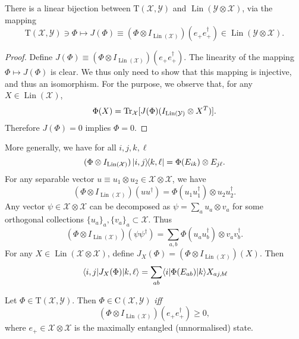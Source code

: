 \documentclass[12pt]{report}
\newcommand{\calY}{{\mathcal{Y}}}
\newcommand{\calX}{{\mathcal{X}}}
\newcommand{\rmC}{{\mathrm{C}}}
\newcommand{\rmT}{{\mathrm{T}}}
\DeclareMathOperator{\Lin}{Lin}
\begin{document}
\begin{prop}
	There is a linear bijection between $\rmT(\calX,\calY)$ and $\Lin(\calY\otimes\calX)$, via the mapping
	\begin{equation}
		\rmT(\calX,\calY)\ni \Phi\mapsto
		J(\Phi) \equiv (\Phi\otimes I_{\Lin(\calX)})(e_+ e_+^\dagger)\in\Lin(\calY\otimes\calX).
	\end{equation}
\end{prop}
\begin{proof}
	Define $J(\Phi) \equiv (\Phi\otimes I_{\Lin(\calX)})(e_+ e_+^\dagger)$.
	The linearity of the mapping $\Phi\mapsto J(\Phi)$ is clear.
	We thus only need to show that this mapping is injective, and thus an isomorphism.
	For the purpose, we observe that, for any $X\in\Lin(\calX)$,
	\begin{equation}
		\Phi(X) = \Tr_\calX [J(\Phi)(I_{\Lin(\calY)}\otimes X^T)].
	\end{equation}
	Therefore $J(\Phi)=0$ implies $\Phi=0$.
\end{proof}

More generally, we have for all $i,j,k,\ell$
\begin{equation}
	(\Phi\otimes I_{\Lin(\calX)})\ketbra{i,j}{k,\ell}
	= \Phi(E_{ik}) \otimes E_{j\ell}.
\end{equation}
For any separable vector $u\equiv u_1\otimes u_2\in\calX\otimes\calX$, we have
\begin{equation}
	(\Phi\otimes I_{\Lin(\calX)}) (uu^\dagger)
	= \Phi(u_1 u_1^\dagger) \otimes u_2 u_2^\dagger.
\end{equation}
Any vector $\psi\in\calX\otimes\calX$ can be decomposed as
$\psi=\sum_a u_a\otimes v_a$ for some orthogonal collections $\{u_a\}_a,\{v_a\}_a\subset\calX$.
Thus
\begin{equation}
	(\Phi\otimes I_{\Lin(\calX)})(\psi\psi^\dagger)
	= \sum_{a,b} \Phi(u_a u_b^\dagger)\otimes v_a v_b^\dagger.
\end{equation}
For any $X\in\Lin(\calX\otimes\calX)$, define
	$J_X(\Phi)
		= (\Phi\otimes I_{\Lin(\calX)})(X)$.
Then
\begin{equation}
	\mel{i,j}{J_X(\Phi)}{k,\ell}
	= \sum_{ab} \langle i|\Phi(E_{ab})|k\rangle X_{aj,b\ell}
\end{equation}

\begin{prop}
	Let $\Phi\in\rmT(\calX,\calY)$. Then $\Phi\in\rmC(\calX,\calY)$ \emph{iff}
	\begin{equation}
		(\Phi\otimes I_{\Lin(\calX)})(e_+ e_+^\dagger)\ge0,
	\end{equation}
	where $e_+\in\calX\otimes\calX$ is the maximally entangled (unnormalised) state.
\end{prop}
\end{document}
